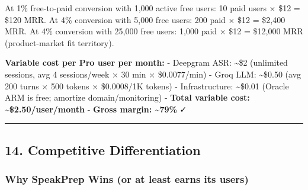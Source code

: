 \documentclass[
  11pt,
]{article}
\begin{document}
At 1\% free-to-paid conversion with 1,000 active free users: 10 paid
users × \$12 = \$120 MRR. At 4\% conversion with 5,000 free users: 200
paid × \$12 = \$2,400 MRR. At 4\% conversion with 25,000 free users:
1,000 paid × \$12 = \$12,000 MRR (product-market fit territory).

\textbf{Variable cost per Pro user per month:} - Deepgram ASR:
\textasciitilde\$2 (unlimited sessions, avg 4 sessions/week × 30 min ×
\$0.0077/min) - Groq LLM: \textasciitilde\$0.50 (avg 200 turns × 500
tokens × \$0.0008/1K tokens) - Infrastructure: \textasciitilde\$0.01
(Oracle ARM is free; amortize domain/monitoring) - \textbf{Total
variable cost: \textasciitilde\$2.50/user/month} - \textbf{Gross margin:
\textasciitilde79\%} ✓

\begin{center}\rule{0.5\linewidth}{0.5pt}\end{center}

\hypertarget{competitive-differentiation}{%
\subsection{14. Competitive
Differentiation}\label{competitive-differentiation}}

\hypertarget{why-speakprep-wins-or-at-least-earns-its-users}{%
\subsubsection{Why SpeakPrep Wins (or at least earns its
users)}\label{why-speakprep-wins-or-at-least-earns-its-users}}
\end{document}

